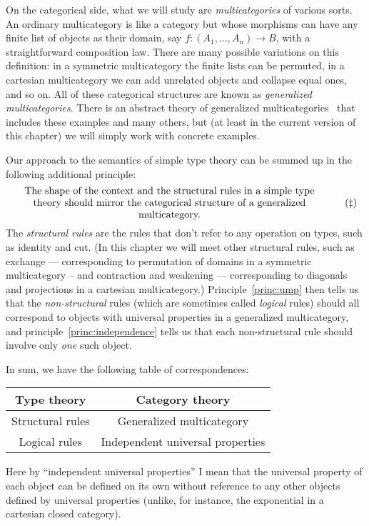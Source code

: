 \documentclass{book}
\begin{document}
On the categorical side, what we will study are \emph{multicategories} of various sorts.
An ordinary multicategory is like a category but whose morphisms can have any finite list of objects as their domain, say $f:(A_1,\dots,A_n) \to B$, with a straightforward composition law.
There are many possible variations on this definition: in a symmetric multicategory the finite lists can be permuted, in a cartesian multicategory we can add unrelated objects and collapse equal ones, and so on.
All of these categorical structures are known as \emph{generalized multicategories}.
There is an abstract theory of generalized multicategories~\cite{cs:multicats,hermida:coh-univ,leinster:higher-opds,burroni:t-cats} that includes these examples and many others, but (at least in the current version of this chapter) we will simply work with concrete examples.

Our approach to the semantics of simple type theory can be summed up in the following additional principle:
\begin{equation}\label{princ:structural}
  \parbox{4.3in}{\centering The shape of the context and the structural rules in a simple type theory should mirror the categorical structure of a generalized multicategory.}\tag{$\ddagger$}
\end{equation}
The \emph{structural rules} are the rules that don't refer to any operation on types, such as identity and cut.
(In this chapter we will meet other structural rules, such as exchange --- corresponding to permutation of domains in a symmetric multicategory -- and contraction and weakening --- corresponding to diagonals and projections in a cartesian multicategory.)
Principle~\eqref{princ:ump} then tells us that the \emph{non-structural} rules (which are sometimes called \emph{logical} rules) should all correspond to objects with universal properties in a generalized multicategory, and principle~\eqref{princ:independence} tells us that each non-structural rule should involve only \emph{one} such object.

In sum, we have the following table of correspondences:
\begin{center}
  \begin{tabular}{c|c}
    Type theory & Category theory\\\hline
    Structural rules & Generalized multicategory\\
    Logical rules & Independent universal properties
  \end{tabular}
\end{center}
Here by ``independent universal properties'' I mean that the universal property of each object can be defined on its own without reference to any other objects defined by universal properties (unlike, for instance, the exponential in a cartesian closed category).
\end{document}
